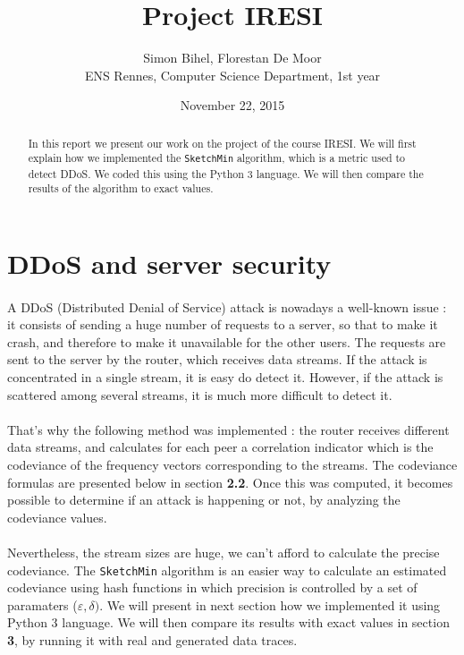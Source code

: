 \documentclass[a4paper]{article}%
\begin{document}
\title{Project IRESI}

\author{Simon Bihel, Florestan De Moor \\ ENS Rennes, Computer Science Department, 1st year}

\date{November 22, 2015}

\maketitle

\begin{abstract}
	In this report we present our work on the project of the course IRESI. We will first explain how we implemented the \texttt{SketchMin} algorithm, which is a metric used to detect DDoS. We coded this using the Python 3 language. We will then compare the results of the algorithm to exact values.
\end{abstract}


\section{DDoS and server security}

\paragraph{}A DDoS (Distributed Denial of Service) attack is nowadays a well-known issue : it consists of sending a huge number of requests to a server, so that to make it crash, and therefore to make it unavailable for the other users. The requests are sent to the server by the router, which receives data streams. If the attack is concentrated in a single stream, it is easy do detect it. However, if the attack is scattered among several streams, it is much more difficult to detect it.

\paragraph{}That's why the following method was implemented : the router receives different data streams, and calculates for each peer a correlation indicator which is the codeviance of the frequency vectors corresponding to the streams. The codeviance formulas are presented below in section \textbf{2.2}. Once this was computed, it becomes possible to determine if an attack is happening or not, by analyzing the codeviance values.

\paragraph{}Nevertheless, the stream sizes are huge, we can't afford to calculate the precise codeviance. The \texttt{SketchMin} algorithm is an easier way to calculate an estimated codeviance using hash functions in which precision is controlled by a set of paramaters ($\varepsilon, \delta)$. We will present in next section how we implemented it using Python 3 language. We will then compare its results with exact values in section \textbf{3}, by running it with real and generated data traces.
\end{document}

